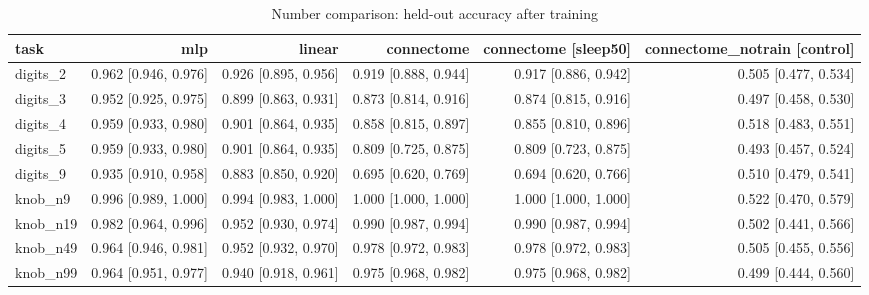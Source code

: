 \begin{table}[t]
\centering
\small
\begin{tabular}{lrrrrr}
\toprule
task & mlp & linear & connectome & connectome [sleep50] & connectome\_notrain [control] \\
\midrule
digits\_2 & 0.962 [0.946, 0.976] & 0.926 [0.895, 0.956] & 0.919 [0.888, 0.944] & 0.917 [0.886, 0.942] & 0.505 [0.477, 0.534] \\
digits\_3 & 0.952 [0.925, 0.975] & 0.899 [0.863, 0.931] & 0.873 [0.814, 0.916] & 0.874 [0.815, 0.916] & 0.497 [0.458, 0.530] \\
digits\_4 & 0.959 [0.933, 0.980] & 0.901 [0.864, 0.935] & 0.858 [0.815, 0.897] & 0.855 [0.810, 0.896] & 0.518 [0.483, 0.551] \\
digits\_5 & 0.959 [0.933, 0.980] & 0.901 [0.864, 0.935] & 0.809 [0.725, 0.875] & 0.809 [0.723, 0.875] & 0.493 [0.457, 0.524] \\
digits\_9 & 0.935 [0.910, 0.958] & 0.883 [0.850, 0.920] & 0.695 [0.620, 0.769] & 0.694 [0.620, 0.766] & 0.510 [0.479, 0.541] \\
knob\_n9 & 0.996 [0.989, 1.000] & 0.994 [0.983, 1.000] & 1.000 [1.000, 1.000] & 1.000 [1.000, 1.000] & 0.522 [0.470, 0.579] \\
knob\_n19 & 0.982 [0.964, 0.996] & 0.952 [0.930, 0.974] & 0.990 [0.987, 0.994] & 0.990 [0.987, 0.994] & 0.502 [0.441, 0.566] \\
knob\_n49 & 0.964 [0.946, 0.981] & 0.952 [0.932, 0.970] & 0.978 [0.972, 0.983] & 0.978 [0.972, 0.983] & 0.505 [0.455, 0.556] \\
knob\_n99 & 0.964 [0.951, 0.977] & 0.940 [0.918, 0.961] & 0.975 [0.968, 0.982] & 0.975 [0.968, 0.982] & 0.499 [0.444, 0.560] \\
\bottomrule
\end{tabular}
\caption{Number comparison: held-out accuracy after training}
\label{tab:comparison_final_acc}
\end{table}